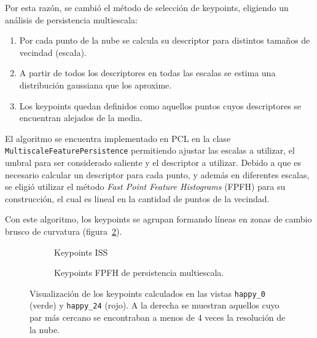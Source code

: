 			Por esta razón, se cambió el método de selección de keypoints,
			eligiendo un análisis de persistencia multiescala:
			\begin{enumerate}
				\item Por cada punto de la nube se calcula su descriptor para distintos tamaños de vecindad (escala).
				\item A partir de todos los descriptores en todas las escalas se estima una distribución gaussiana que los aproxime.
				\item Los keypoints quedan definidos como aquellos puntos cuyos descriptores se encuentran alejados de la media\cite{Rusu:2009:FPF:1703435.1703733}.
			\end{enumerate}
			El algoritmo se encuentra implementado en PCL en la clase
			\texttt{Multiscale\-Feature\-Persistence} permitiendo ajustar las
			escalas a utilizar, el umbral para ser considerado saliente y el descriptor a utilizar.
			Debido a que es necesario calcular un descriptor para cada punto, y
			además en diferentes escalas, se eligió utilizar el método
			\emph{Fast Point Feature Histograms} (FPFH) para su construcción,
			el cual es lineal en la cantidad de puntos de la vecindad.

			Con este algoritmo, los keypoints se agrupan formando líneas en zonas de cambio brusco de curvatura (figura~\ref{fig:multiscale_key}).


			\begin{figure}
				\centering
				\begin{subfigure}{\linewidth}
					\caption[Keypoints ISS]{\label{fig:iss_key}Keypoints ISS}
				\end{subfigure}

				\begin{subfigure}{\linewidth}
					\caption[Keypoints FPFH de persistencia multiescala]{\label{fig:multiscale_key}Keypoints FPFH de persistencia multiescala.}
				\end{subfigure}
				\caption[Visualización de los keypoints]{\label{fig:keypoints}Visualización de los keypoints calculados en las vistas
					\texttt{happy\_0} (verde) y \texttt{happy\_24} (rojo).
					A la derecha se muestran aquellos cuyo par
					más cercano se encontraban a menos de 4 veces la resolución
					de la nube.}
			\end{figure}



